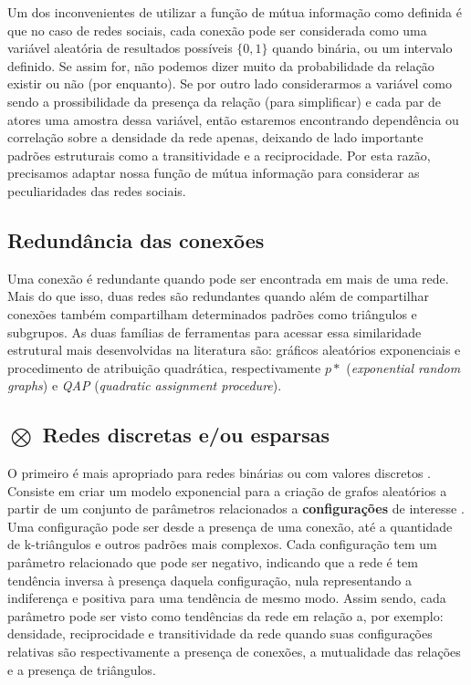 Um dos inconvenientes de utilizar a função de mútua informação como definida é
que no caso de redes sociais, cada conexão pode ser considerada como uma
variável aleatória de resultados possíveis $\{0,1\}$ quando binária, ou um
intervalo definido. Se assim for, não podemos dizer muito da probabilidade da
relação existir ou não (por enquanto). Se por outro lado considerarmos a
variável como sendo a prossibilidade da presença da relação (para simplificar) e
cada par de atores uma amostra dessa variável, então estaremos encontrando
dependência ou correlação sobre a densidade da rede apenas, deixando de lado
importante padrões estruturais como a transitividade e a reciprocidade. Por esta
razão, precisamos adaptar nossa função de mútua informação para considerar as
peculiaridades das redes sociais. 

\subsection{Redundância das conexões}

Uma conexão é redundante quando pode ser encontrada em mais de uma rede. Mais do
que isso, duas redes são redundantes quando além de compartilhar conexões também
compartilham determinados padrões como triângulos e subgrupos. As duas
famílias de ferramentas para acessar essa similaridade estrutural mais
desenvolvidas na literatura são: gráficos aleatórios exponenciais e procedimento
de atribuição quadrática, respectivamente $p*$ (\emph{exponential random
graphs}) e \emph{QAP} (\emph{quadratic assignment procedure}).

\subsection{$\bigotimes$ Redes discretas e/ou esparsas}

O primeiro é mais apropriado para redes binárias ou com valores discretos
\citep{Dekker2007}. Consiste em criar um modelo exponencial para a criação de
grafos aleatórios a partir de um conjunto de parâmetros relacionados a
\textbf{configurações} de interesse \citep{ROBINS2007a}. Uma configuração pode
ser desde a presença de uma conexão, até a quantidade de k-triângulos e outros
padrões mais complexos. Cada configuração tem um parâmetro relacionado que pode
ser negativo, indicando que a rede é tem tendência inversa à presença daquela
configuração, nula representando a indiferença e positiva para uma tendência de
mesmo modo. Assim sendo, cada parâmetro pode ser visto como tendências da rede em
relação a, por exemplo: densidade, reciprocidade e transitividade da rede quando
suas configurações relativas são respectivamente a presença de conexões, a
mutualidade das relações e a presença de triângulos.

